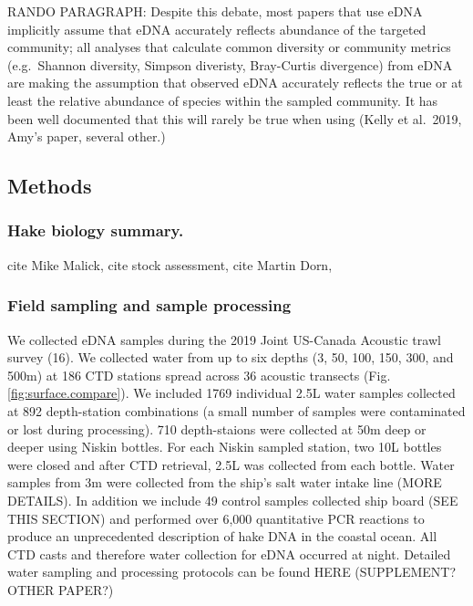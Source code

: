 \documentclass[
]{article}
\begin{document}
RANDO PARAGRAPH: Despite this debate, most papers that use eDNA
implicitly assume that eDNA accurately reflects abundance of the
targeted community; all analyses that calculate common diversity or
community metrics (e.g.~Shannon diversity, Simpson diveristy,
Bray-Curtis divergence) from eDNA are making the assumption that
observed eDNA accurately reflects the true or at least the relative
abundance of species within the sampled community. It has been well
documented that this will rarely be true when using (Kelly et al.~2019,
Amy's paper, several other.)

\clearpage

\hypertarget{methods}{%
\subsection{Methods}\label{methods}}

\hypertarget{hake-biology-summary.}{%
\subsubsection{Hake biology summary.}\label{hake-biology-summary.}}

cite Mike Malick, cite stock assessment, cite Martin Dorn,

\hypertarget{field-sampling-and-sample-processing}{%
\subsubsection{Field sampling and sample
processing}\label{field-sampling-and-sample-processing}}

We collected eDNA samples during the 2019 Joint US-Canada Acoustic trawl
survey (16). We collected water from up to six depths (3, 50, 100, 150,
300, and 500m) at 186 CTD stations spread across 36 acoustic transects
(Fig. \ref{fig:surface.compare}). We included 1769 individual 2.5L water
samples collected at 892 depth-station combinations (a small number of
samples were contaminated or lost during processing). 710 depth-staions
were collected at 50m deep or deeper using Niskin bottles. For each
Niskin sampled station, two 10L bottles were closed and after CTD
retrieval, 2.5L was collected from each bottle. Water samples from 3m
were collected from the ship's salt water intake line (MORE DETAILS). In
addition we include 49 control samples collected ship board (SEE THIS
SECTION) and performed over 6,000 quantitative PCR reactions to produce
an unprecedented description of hake DNA in the coastal ocean. All CTD
casts and therefore water collection for eDNA occurred at night.
Detailed water sampling and processing protocols can be found HERE
(SUPPLEMENT? OTHER PAPER?)
\end{document}
